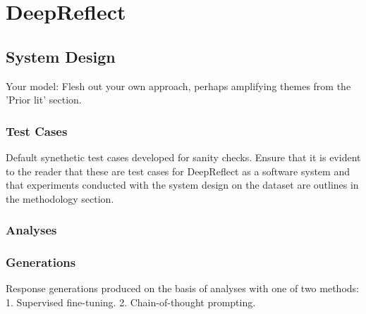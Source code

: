 
\section{DeepReflect}

\subsection{System Design}\label{sec:deepreflect}
\textcolor{black!40}{Your model: Flesh out your own approach, perhaps amplifying themes from the 'Prior lit' section.}

\subsubsection{Test Cases}
\textcolor{black!40}{Default synethetic test cases developed for sanity checks.}
\textcolor{black!40}{Ensure that it is evident to the reader that these are test cases for DeepReflect as a software system and that experiments conducted with the system design on the dataset are outlines in the methodology section.}
\textcolor{black!30}{\lipsum[9-10]}

\subsubsection{Analyses}
\textcolor{black!30}{\lipsum[8-9]}

\subsubsection{Generations}

\textcolor{black!60}{Response generations produced on the basis of analyses with one of two methods: 1. Supervised fine-tuning.
2. Chain-of-thought prompting.}
\textcolor{black!30}{\lipsum[9-10]}

